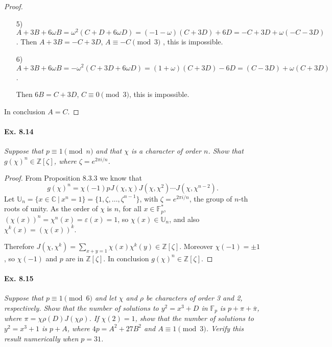 \documentclass[11pt,a4paper]{article}
\newcommand{\Z}{\mathbb{Z}}
\newcommand{\C}{\mathbb{C}}
\newcommand{\F}{\mathbb{F}}
\begin{document}
{\begin{proof}
\begin{enumerate}
Then $A+3B = -6D$, $A \equiv 0 \pmod 3$, this is impossible.

\item[5)] $A+3B + 6\omega B = \omega^2(C+D+6\omega D) = (-1-\omega)(C + 3D) + 6D  = -C + 3D + \omega (-C-3D)$.
Then $A+3B = - C +3D$, $A\equiv -C \pmod 3$ , this is impossible.

\item[6)] $A + 3B + 6 \omega B = -\omega^2(C+3D + 6\omega D) = (1 + \omega)(C+3D) - 6D = (C-3D) + \omega(C+3D)$.

Then $6B = C+ 3D$, $C \equiv 0 \pmod 3$, this is impossible.
\end{enumerate}
In conclusion $A = C$.
\end{proof}

\paragraph{Ex. 8.14}

{\it Suppose that $p\equiv 1 \pmod n$ and that $\chi$ is a character of order $n$. Show that $g(\chi)^n \in\Z[\zeta]$, where $\zeta = e^{2\pi i/n}$.
}

\begin{proof}
From Proposition 8.3.3 we know that
$$g(\chi)^n = \chi(-1) p J(\chi,\chi) J(\chi, \chi^2) \cdots J(\chi, \chi^{n-2}).$$
Let $\mathbb{U}_n =\{x \in \C\ | \ x^n = 1\} = \{1, \zeta, \ldots, \zeta^{n-1}\}$, with $\zeta = e^{2\pi i/n}$, the group of $n$-th roots of unity. As the order of $\chi$ is $n$, for all $x \in \F_p^*$, $(\chi(x))^n = \chi^n(x) = \varepsilon(x) = 1$, so $\chi(x) \in \mathbb{U}_n$, and also $\chi^k(x) = (\chi(x))^k$.

Therefore $J(\chi,\chi^k) = \sum\limits_{x+y=1} \chi(x) \chi^k(y) \in \Z[\zeta]$. Moreover $\chi(-1) = \pm 1$, so $\chi(-1)$ and $p$ are in $\Z[\zeta]$. In conclusion $g(\chi)^n \in \Z[\zeta]$.
\end{proof}

\paragraph{Ex. 8.15}

{\it Suppose that $p\equiv 1 \pmod 6$ and let $\chi$ and $\rho$ be characters of order 3 and 2, respectively. Show that the number of solutions to $y^2 = x^3 + D$ in $\F_p$ is $p+\pi+\overline{\pi}$, where $\pi = \chi \rho(D) J(\chi\rho)$. If $\chi(2) = 1$, show that the number of solutions to $y^2 = x^3 + 1$ is $p+A$, where $4p = A^2+27B^2$ and $A\equiv 1 \pmod 3$. Verify this result numerically when $p=31$.
}

}
\end{document}
